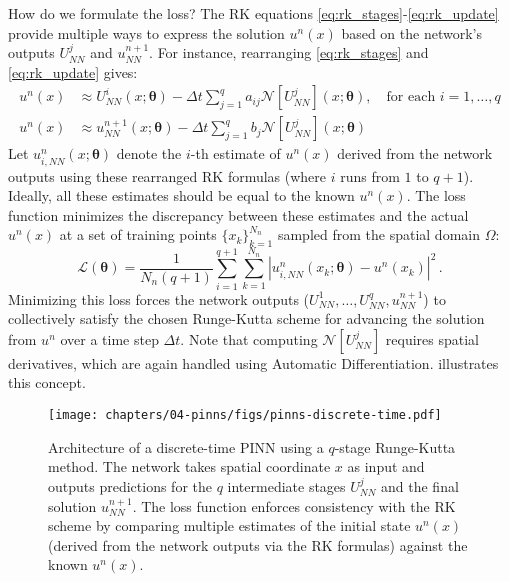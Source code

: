 How do we formulate the loss? The RK equations \eqref{eq:rk_stages}-\eqref{eq:rk_update} provide multiple ways to express the solution $u^n(x)$ based on the network's outputs $U^j_{NN}$ and $u^{n+1}_{NN}$. For instance, rearranging \eqref{eq:rk_stages} and \eqref{eq:rk_update} gives:
%
\begin{align}
    u^n(x) &\approx U^i_{NN}(x; \boldsymbol{\theta}) - \Delta t \sum_{j=1}^q a_{ij} \mathcal{N}[U^j_{NN}](x; \boldsymbol{\theta}), \quad \text{for each } i = 1, \ldots, q \\
    u^n(x) &\approx u^{n+1}_{NN}(x; \boldsymbol{\theta}) - \Delta t \sum_{j=1}^q b_j \mathcal{N}[U^j_{NN}](x; \boldsymbol{\theta})
\end{align}
%
Let $u^n_{i, NN}(x; \boldsymbol{\theta})$ denote the $i$-th estimate of $u^n(x)$ derived from the network outputs using these rearranged RK formulas (where $i$ runs from $1$ to $q+1$). Ideally, all these estimates should be equal to the known $u^n(x)$. The loss function minimizes the discrepancy between these estimates and the actual $u^n(x)$ at a set of training points $\{x_k\}_{k=1}^{N_n}$ sampled from the spatial domain $\Omega$:
%
\begin{equation}
\mathcal{L}(\boldsymbol{\theta}) = \frac{1}{N_n (q+1)} \sum_{i=1}^{q+1} \sum_{k=1}^{N_n} |u^n_{i, NN}(x_k; \boldsymbol{\theta}) - u^n(x_k)|^2 \,.
\label{eq:loss_dt_pinn}
\end{equation}
%
Minimizing this loss forces the network outputs ($U^1_{NN}, \ldots, U^q_{NN}, u^{n+1}_{NN}$) to collectively satisfy the chosen Runge-Kutta scheme for advancing the solution from $u^n$ over a time step $\Delta t$. Note that computing $\mathcal{N}[U^j_{NN}]$ requires spatial derivatives, which are again handled using Automatic Differentiation.  illustrates this concept.

\begin{figure}[htbp]
    \centering
    \texttt{[image: chapters/04-pinns/figs/pinns-discrete-time.pdf]}
    \caption{Architecture of a discrete-time PINN using a $q$-stage Runge-Kutta method. The network takes spatial coordinate $x$ as input and outputs predictions for the $q$ intermediate stages $U^j_{NN}$ and the final solution $u^{n+1}_{NN}$. The loss function enforces consistency with the RK scheme by comparing multiple estimates of the initial state $u^n(x)$ (derived from the network outputs via the RK formulas) against the known $u^n(x)$.}
    \label{fig:discrete-time-pinn}
\end{figure}

